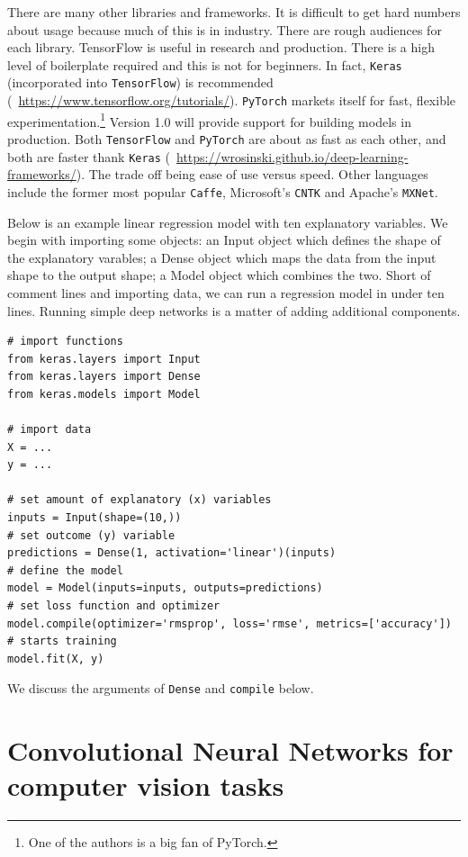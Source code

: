 \documentclass[12pt, a4paper, oneside, headinclude, footinclude]{article}
\begin{document}
There are many other libraries and frameworks. It is difficult to get hard numbers
about usage because much of this is in industry. There are rough
audiences for each library. TensorFlow is useful in research and production.
There is a high level of boilerplate required and this is not for beginners.
In fact, \texttt{Keras} (incorporated into \texttt{TensorFlow}) is recommended
(~\url{https://www.tensorflow.org/tutorials/}). \texttt{PyTorch} markets
itself for fast, flexible experimentation.\footnote{One of the authors is a
big fan of PyTorch.} Version 1.0 will provide support for building models in
production. Both \texttt{TensorFlow} and \texttt{PyTorch} are about as fast as
each other, and both are faster thank \texttt{Keras}
(~\url{https://wrosinski.github.io/deep-learning-frameworks/}). The trade off
being ease of use versus speed. Other languages include the former most
popular \texttt{Caffe}, Microsoft's \texttt{CNTK} and Apache's \texttt{MXNet}.

Below is an example linear regression model with ten explanatory variables.
We begin with importing some objects: an Input object which defines the shape
of the explanatory varables; a Dense object which maps the data from the input
shape to the output shape; a Model object which combines the two. Short of
comment lines and importing data, we can run a regression model in under ten
lines. Running simple deep networks is a matter of adding additional
components.

\begin{verbatim}
# import functions
from keras.layers import Input
from keras.layers import Dense
from keras.models import Model

# import data
X = ...
y = ...

# set amount of explanatory (x) variables 
inputs = Input(shape=(10,))
# set outcome (y) variable
predictions = Dense(1, activation='linear')(inputs)
# define the model
model = Model(inputs=inputs, outputs=predictions)
# set loss function and optimizer
model.compile(optimizer='rmsprop', loss='rmse', metrics=['accuracy'])
# starts training
model.fit(X, y)  
\end{verbatim}

We discuss the arguments of \texttt{Dense} and \texttt{compile} below. 

\section{Convolutional Neural Networks for computer vision tasks}
\end{document}
